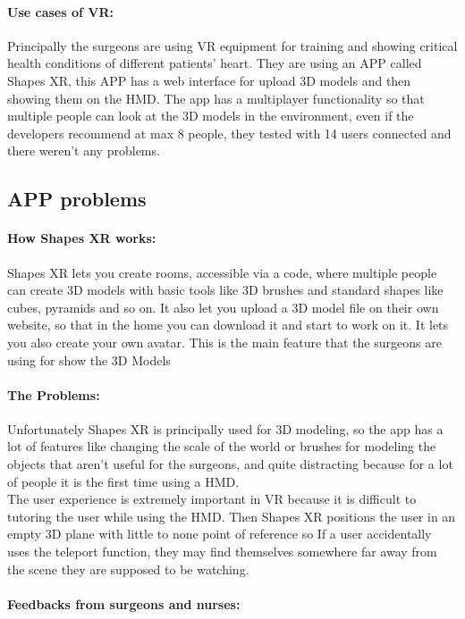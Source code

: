 \paragraph{Use cases of VR:}
Principally the surgeons are using VR equipment for training and showing critical health conditions of different patients' heart.
They are using an APP called Shapes XR, this APP has a web interface for upload 3D models and then showing them on the \ac{HMD}.
The app has a multiplayer functionality so that multiple people can look at the 3D models in the environment, even if the developers recommend at max 8 people, they tested with 14 users connected and there weren't any problems.

\subsection{APP problems}

\paragraph{How Shapes XR works:}
Shapes XR lets you create rooms, accessible via a code, where multiple people can create 3D models with basic tools like 3D brushes and standard shapes like cubes, pyramids and so on.
It also let you upload a 3D model file on their own website, so that in the home you can download it and start to work on it.
It lets you also create your own avatar.
This is the main feature that the surgeons are using for show the 3D Models

\paragraph{The Problems:}
Unfortunately Shapes XR is principally used for 3D modeling, so the app has a lot of features like changing the scale of the world or brushes for modeling the objects that aren't useful for the surgeons,
and quite distracting because for a lot of people it is the first time using a \ac{HMD}.\\
The user experience is extremely important in \ac{VR} because it is difficult to tutoring the user while using the \ac{HMD}.
Then Shapes XR positions the user in an empty 3D plane with little to none point of reference so If a user accidentally uses the teleport function, they may find themselves somewhere far away from the scene they are supposed to be watching.

\paragraph{Feedbacks from surgeons and nurses:}

